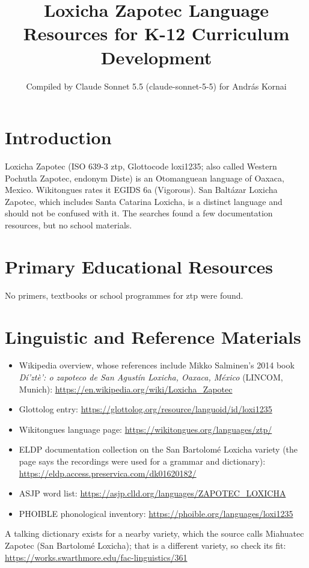 \documentclass[12pt]{article}
\title{Loxicha Zapotec Language Resources for K-12 Curriculum Development}
\author{Compiled by Claude Sonnet 5.5 (claude-sonnet-5-5) for Andr\'as Kornai}
\date{}
\begin{document}
\maketitle

\section{Introduction}
Loxicha Zapotec (ISO 639-3 ztp, Glottocode loxi1235; also called Western Pochutla Zapotec, endonym Diste) is an Otomanguean language of Oaxaca, Mexico. Wikitongues rates it EGIDS 6a (Vigorous). San Balt\'azar Loxicha Zapotec, which includes Santa Catarina Loxicha, is a distinct language and should not be confused with it. The searches found a few documentation resources, but no school materials.

\section{Primary Educational Resources}
No primers, textbooks or school programmes for ztp were found.

\section{Linguistic and Reference Materials}
\begin{itemize}
\item Wikipedia overview, whose references include Mikko Salminen's 2014 book \emph{D\'i'zt\`e': o zapoteco de San Agust\'in Loxicha, Oaxaca, M\'exico} (LINCOM, Munich): \url{https://en.wikipedia.org/wiki/Loxicha_Zapotec}
\item Glottolog entry: \url{https://glottolog.org/resource/languoid/id/loxi1235}
\item Wikitongues language page: \url{https://wikitongues.org/languages/ztp/}
\item ELDP documentation collection on the San Bartolom\'e Loxicha variety (the page says the recordings were used for a grammar and dictionary): \url{https://eldp.access.preservica.com/dk01620182/}
\item ASJP word list: \url{https://asjp.clld.org/languages/ZAPOTEC_LOXICHA}
\item PHOIBLE phonological inventory: \url{https://phoible.org/languages/loxi1235}
\end{itemize}
A talking dictionary exists for a nearby variety, which the source calls Miahuatec Zapotec (San Bartolom\'e Loxicha); that is a different variety, so check its fit: \url{https://works.swarthmore.edu/fac-linguistics/361}
\end{document}
